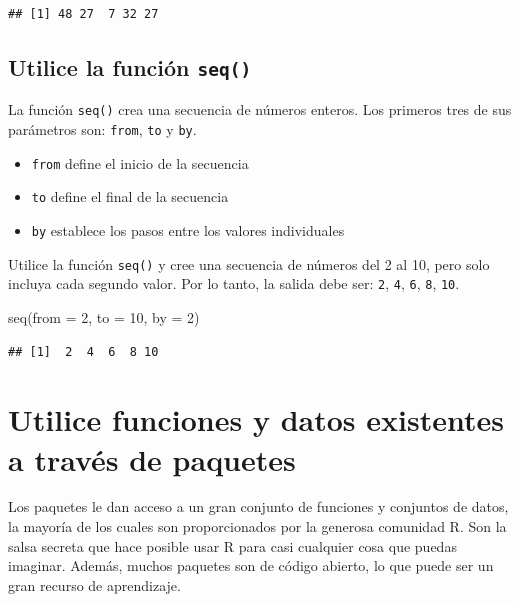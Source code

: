 \documentclass[
]{book}
\newenvironment{Shaded}{\begin{snugshade}}{\end{snugshade}}
\newcommand{\AttributeTok}[1]{\textcolor[rgb]{0.77,0.63,0.00}{#1}}
\newcommand{\DecValTok}[1]{\textcolor[rgb]{0.00,0.00,0.81}{#1}}
\newcommand{\FunctionTok}[1]{\textcolor[rgb]{0.00,0.00,0.00}{#1}}
\newcommand{\NormalTok}[1]{#1}
\providecommand{\tightlist}{%
  \setlength{\itemsep}{0pt}\setlength{\parskip}{0pt}}
\begin{document}
\begin{verbatim}
## [1] 48 27  7 32 27
\end{verbatim}

\hypertarget{utilice-la-funciuxf3n-seq}{%
\subsection{\texorpdfstring{Utilice la función \texttt{seq()}}{Utilice la función seq()}}\label{utilice-la-funciuxf3n-seq}}

La función \texttt{seq()} crea una secuencia de números enteros. Los primeros tres de sus parámetros son: \texttt{from}, \texttt{to} y \texttt{by}.

\begin{itemize}
\tightlist
\item
  \texttt{from} define el inicio de la secuencia
\item
  \texttt{to} define el final de la secuencia
\item
  \texttt{by} establece los pasos entre los valores individuales
\end{itemize}

Utilice la función \texttt{seq()} y cree una secuencia de números del 2 al 10, pero solo incluya cada segundo valor. Por lo tanto, la salida debe ser: \texttt{2}, \texttt{4}, \texttt{6}, \texttt{8}, \texttt{10}.

\begin{Shaded}
\begin{Highlighting}[]
\FunctionTok{seq}\NormalTok{(}\AttributeTok{from =} \DecValTok{2}\NormalTok{, }\AttributeTok{to =} \DecValTok{10}\NormalTok{, }\AttributeTok{by =} \DecValTok{2}\NormalTok{)}
\end{Highlighting}
\end{Shaded}

\begin{verbatim}
## [1]  2  4  6  8 10
\end{verbatim}

\hypertarget{utilice-funciones-y-datos-existentes-a-travuxe9s-de-paquetes}{%
\section{Utilice funciones y datos existentes a través de paquetes}\label{utilice-funciones-y-datos-existentes-a-travuxe9s-de-paquetes}}

Los paquetes le dan acceso a un gran conjunto de funciones y conjuntos de datos, la mayoría de los cuales son proporcionados por la generosa comunidad R. Son la salsa secreta que hace posible usar R para casi cualquier cosa que puedas imaginar. Además, muchos paquetes son de código abierto, lo que puede ser un gran recurso de aprendizaje.
\end{document}
